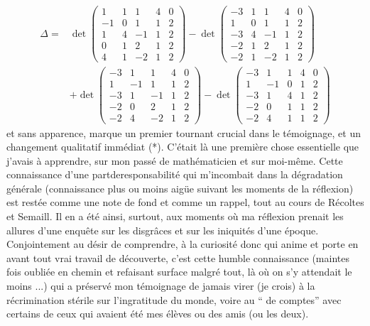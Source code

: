 \[\begin{aligned}
\Delta={}&\det\begin{pmatrix}
1&1&1&4&0\\-1&0&1&1&2\\1&4&-1&1&2\\0&1&2&1&2\\4&1&-2&1&2
\end{pmatrix}
-\det\begin{pmatrix}
-3&1&1&4&0\\1&0&1&1&2\\-3&4&-1&1&2\\-2&1&2&1&2\\-2&1&-2&1&2
\end{pmatrix}\\
&+\det\begin{pmatrix}
-3&1&1&4&0\\1&-1&1&1&2\\-3&1&-1&1&2\\-2&0&2&1&2\\-2&4&-2&1&2
\end{pmatrix}
-\det\begin{pmatrix}
-3&1&1&4&0\\1&-1&0&1&2\\-3&1&4&1&2\\-2&0&1&1&2\\-2&4&1&1&2
\end{pmatrix}
\end{aligned}\]
et sans apparence, marque un premier tournant crucial dans le témoignage, et un changement qualitatif immédiat (*). C'était là une première chose essentielle que j'avais à apprendre, sur mon passé de mathématicien et sur moi-même. Cette connaissance d'une p\enspace a\enspace r\enspace t\quad d\enspace e\quad r\enspace e\enspace s\enspace p\enspace o\enspace n\enspace s\enspace a\enspace b\enspace i\enspace l\enspace i\enspace t\enspace é qui m'incombait dans la dégradation générale (connaissance plus ou moins aigüe suivant les moments de la réflexion) est restée comme une note de fond et comme un rappel, tout au cours de Récoltes et Semaill. Il en a été ainsi, surtout, aux moments où ma réflexion prenait les allures d'une enquête sur les disgrâces et sur les iniquités d'une époque. Conjointement au désir de comprendre, à la curiosité donc qui anime et porte en avant tout vrai travail de découverte, c'est cette humble connaissance (maintes fois oubliée en chemin et refaisant surface malgré tout, là où on s'y attendait le moins ...) qui a préservé mon témoignage de jamais virer (je crois) à la récrimination stérile sur l'ingratitude du monde, voire au `` de comptes'' avec certains de ceux qui avaient été mes élèves ou des amis (ou les deux).

